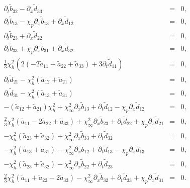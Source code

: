 \documentclass[
10pt, %
a4paper, %
oneside, %
headinclude,footinclude, %
table
]{scrartcl}
\begin{document}
$$\begin{array}{rcl}
\partial_{t}{\tilde{b}_{32}}-\partial_{x}{\tilde{d}_{33}}&=&0,\\   
\partial_{t}{\tilde{b}_{13}}-\chi _p\partial_{x}{\tilde{b}_{13}}+\partial_{x}{\tilde{d}_{12}}&=&0,\\   
\partial_{t}{\tilde{b}_{23}}+\partial_{x}{\tilde{d}_{22}}&=&0,\\   
\partial_{t}{\tilde{b}_{33}}+\chi _p\partial_{x}{\tilde{b}_{31}}+\partial_{x}{\tilde{d}_{32}}&=&0,\\   
\frac{1}{3}\chi _h^2 \left(2 \left(-2\tilde{a}_{11}+\tilde{a}_{22}+\tilde{a}_{33}\right) +3\partial_{t}{\tilde{d}_{11}}\right)&=&0,\\   
\partial_{t}{\tilde{d}_{21}}-\chi _h^2\left(\tilde{a}_{12}+\tilde{a}_{21}\right) &=&0,\\   
\partial_{t}{\tilde{d}_{31}}-\chi _h^2\left(\tilde{a}_{13}+\tilde{a}_{31}\right) &=&0,\\   
-\left(\tilde{a}_{12}+\tilde{a}_{21}\right) \chi _h^2+\chi _{\infty }^2\partial_{x}{\tilde{b}_{13}}+\partial_{t}{\tilde{d}_{12}}-\chi _p\partial_{x}{\tilde{d}_{12}}&=&0,\\   
\frac{2}{3} \chi _h^2 \left(\tilde{a}_{11}-2\tilde{a}_{22}+\tilde{a}_{33}\right)+\chi _{\infty }^2\partial_{x}{\tilde{b}_{23}}+\partial_{t}{\tilde{d}_{22}}+\chi _p\partial_{x}{\tilde{d}_{21}}&=&0,\\   
-\chi _h^2\left(\tilde{a}_{23}+\tilde{a}_{32}\right) +\chi _{\infty}^2\partial_{x}{\tilde{b}_{33}}+\partial_{t}{\tilde{d}_{32}}&=&0,\\   
-\chi _h^2\left(\tilde{a}_{13}+\tilde{a}_{31}\right)-\chi _{\infty }^2 \partial_{x}{\tilde{b}_{12}}+\partial_{t}{\tilde{d}_{13}}-\chi _p\partial_{x}{\tilde{d}_{13}}&=&0,\\   
- \chi _h^2\left(\tilde{a}_{23}+\tilde{a}_{32}\right)-\chi _{\infty}^2 \partial_{x}{\tilde{b}_{22}}+\partial_{t}{\tilde{d}_{23}}&=&0,\\   
\frac{2}{3}\chi _h^2\left(\tilde{a}_{11}+\tilde{a}_{22}-2 \tilde{a}_{33}\right) -\chi _{\infty }^2\partial_{x}{\tilde{b}_{32}}+\partial_{t}{\tilde{d}_{33}}+\chi _p \partial_{x}{\tilde{d}_{31}}&=&0.
   \end{array}
   $$
\end{document}
